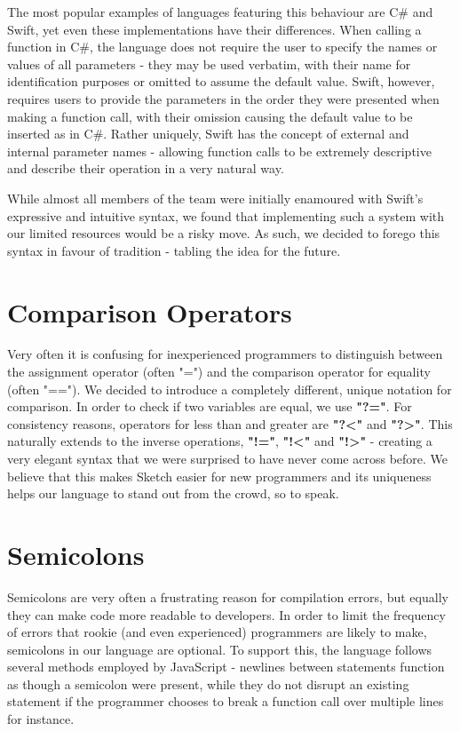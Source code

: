 \documentclass{l3proj}
\begin{document}
The most popular examples of languages featuring this behaviour are C\# and Swift, yet even these implementations have their differences. When calling a function in C\#, the language does not require the user to specify the names or values of all parameters - they may be used verbatim, with their name for identification purposes or omitted to assume the default value. Swift, however, requires users to provide the parameters in the order they were presented when making a function call, with their omission causing the default value to be inserted as in C\#. Rather uniquely, Swift has the concept of external and internal parameter names - allowing function calls to be extremely descriptive and describe their operation in a very natural way.

While almost all members of the team were initially enamoured with Swift's expressive and intuitive syntax, we found that implementing such a system with our limited resources would be a risky move. As such, we decided to forego this syntax in favour of tradition - tabling the idea for the future.

\section{Comparison Operators}
Very often it is confusing for inexperienced programmers to distinguish between the assignment operator (often "=") and the comparison operator for equality (often "=="). We decided to introduce a completely different, unique notation for comparison. In order to check if two variables are equal, we use \textbf{"?="}. For consistency reasons, operators for less than and greater are \textbf{"?\textless"} and \textbf{"?\textgreater"}. This naturally extends to the inverse operations, \textbf{"!="}, \textbf{"!\textless{}"} and \textbf{"!\textgreater{}"} - creating a very elegant syntax that we were surprised to have never come across before. We believe that this makes Sketch easier for new programmers and its uniqueness helps our language to stand out from the crowd, so to speak.

\section {Semicolons}
Semicolons are very often a frustrating reason for compilation errors, but equally they can make code more readable to developers. In order to limit the frequency of errors that rookie (and even experienced) programmers are likely to make, semicolons in our language are optional. To support this, the language follows several methods employed by JavaScript - newlines between statements function as though a semicolon were present, while they do not disrupt an existing statement if the programmer chooses to break a function call over multiple lines for instance.
\end{document}
